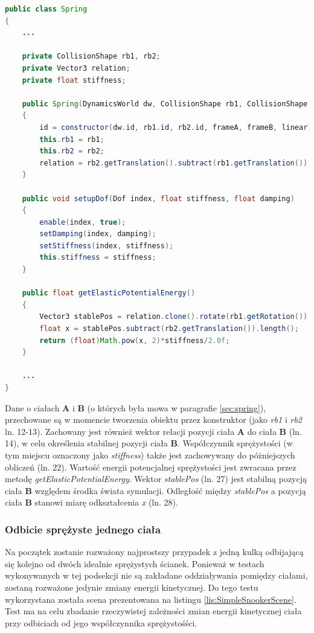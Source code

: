 \begin{lstlisting}[language=Java,
caption=Obliczanie energii potencjalnej spręzystości,label=lis:epelastic]
public class Spring
{
	...
	
	private CollisionShape rb1, rb2;
	private Vector3 relation;
	private float stiffness;
	
	public Spring(DynamicsWorld dw, CollisionShape rb1, CollisionShape rb2, Vector3 frameA, Vector3 frameB, boolean linear)
	{
		id = constructor(dw.id, rb1.id, rb2.id, frameA, frameB, linear);
		this.rb1 = rb1;
		this.rb2 = rb2;
		relation = rb2.getTranslation().subtract(rb1.getTranslation());
	}
	
	public void setupDof(Dof index, float stiffness, float damping)
	{
		enable(index, true);
		setDamping(index, damping);
		setStiffness(index, stiffness);
		this.stiffness = stiffness;
	}
	
	public float getElasticPotentialEnergy()
	{
		Vector3 stablePos = relation.clone().rotate(rb1.getRotation()).add(rb1.getTranslation());
		float x = stablePos.subtract(rb2.getTranslation()).length();
		return (float)Math.pow(x, 2)*stiffness/2.0f;
	}
	
	...
}
\end{lstlisting}
Dane o ciałach \textbf{A} i \textbf{B} (o których była mowa w paragrafie
\ref{sec:spring}), przechowane są w momencie tworzenia obiektu przez konstruktor
(jako \emph{rb1} i \emph{rb2} ln. 12-13). Zachowany jest również wektor relacji
pozycji ciała \textbf{A} do ciała \textbf{B} (ln. 14), w celu określenia
stabilnej pozycji ciała \textbf{B}. Współczynnik sprężystości (w tym miejscu
oznaczony jako \emph{stiffness}) także jest zachowywany do póżniejszych obliczeń
(ln. 22). Wartość energii potencjalnej sprężystości jest zwracana przez metodę
\emph{getElasticPotentialEnergy}. Wektor \emph{stablePos} (ln. 27) jest stabilną
pozycją ciała \textbf{B} względem środka świata symulacji. Odległość między
\emph{stablePos} a pozycją ciała \textbf{B} stanowi miarę odkształcenia
\emph{x} (ln. 28).

\subsubsection{Odbicie sprężyste jednego ciała}\label{sec:odbicie1ciala}
Na początek zostanie rozważony najprostszy przypadek z jedną kulką
odbijającą się kolejno od dwóch idealnie sprężystych ścianek. Ponieważ w
testach wykonywanych w tej podsekcji nie są zakładane oddziaływania pomiędzy
ciałami, zostaną rozważone jedynie zmiany energii kinetycznej. Do tego testu
wykorzystana została scena prezentowana na listingu
\ref{lis:SimpleSnookerScene}. Test ma na celu zbadanie rzeczywistej zależności
zmian energii kinetycznej ciała przy odbiciach od jego współczynnika
sprężystośści.

